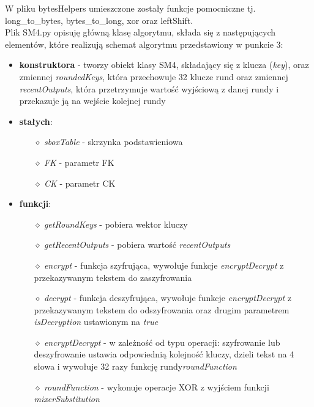 \newline W pliku bytesHelpers umieszczone zostały funkcje pomocniczne tj. long\_to\_bytes, bytes\_to\_long, xor oraz leftShift. \\

Plik SM4.py opisuję główną klasę algorytmu, składa się z następujących elementów, które realizują schemat algorytmu przedstawiony w punkcie 3:

\begin{itemize}
\setlength\itemsep{1.2em}
    \item \textbf{konstruktora} - tworzy obiekt klasy SM4, składający się z klucza (\textit{key}), oraz zmiennej \textit{roundedKeys}, która przechowuje 32 klucze rund oraz zmiennej \textit{recentOutputs}, która przetrzymuje wartość wyjściową z danej rundy i przekazuje ją na wejście kolejnej rundy
    \item \textbf{stałych}: 
    \begin{itemize}
    \setlength\itemsep{1em}
        \item [$\diamond$] \textit{sboxTable} - skrzynka podstawieniowa
        \item [$\diamond$] \textit{FK} - parametr FK
        \item [$\diamond$] \textit{CK} - parametr CK
    \end{itemize}
    \item \textbf{funkcji}: 
    \begin{itemize}
    \setlength\itemsep{1em}
        \item [$\diamond$] \textit{getRoundKeys} - pobiera wektor kluczy
        \item [$\diamond$] \textit{getRecentOutputs} - pobiera wartość \textit{recentOutputs}
        \item [$\diamond$] \textit{encrypt} - funkcja szyfrująca, wywołuje funkcje \textit{encryptDecrypt} z przekazywanym tekstem do zaszyfrowania
        \item [$\diamond$] \textit{decrypt} - funkcja deszyfrująca, wywołuje funkcje \textit{encryptDecrypt} z przekazywanym tekstem do odszyfrowania oraz drugim parametrem \textit{isDecryption} ustawionym na \textit{true}
        \item [$\diamond$] \textit{encryptDecrypt} - w zależność od typu operacji: szyfrowanie lub deszyfrowanie ustawia odpowiednią kolejność kluczy, dzieli tekst na 4 słowa i wywołuje 32 razy funkcję rundy\textit{roundFunction}
        \item [$\diamond$] \textit{roundFunction} - wykonuje operacje XOR z wyjściem funkcji \textit{mixerSubstitution}

\end{itemize}
\end{itemize}
